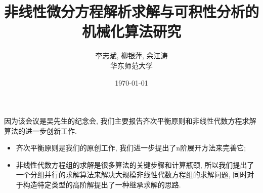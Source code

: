 \documentclass{beamer}
\title[]{非线性微分方程解析求解与可积性分析的机械化算法研究}
\author[]{李志斌, 柳银萍, 余江涛\\[1em] 华东师范大学}
\date{\today}
\begin{document}

    

    

    

\begin{frame}
因为该会议是吴先生的纪念会, 我们主要报告齐次平衡原则和非线性代数方程求解算法的进一步创新工作. 
\begin{itemize}
\item 齐次平衡原则是我们的原创工作, 我们进一步提出了n阶展开方法来完善它; 
\item 非线性代数方程组的求解是很多算法的关键步骤和计算瓶颈, 所以我们提出了一个分组并行的求解算法来解决大规模非线性代数方程组的求解问题, 同时对于构造特定类型的高阶解提出了一种继承求解的思路. 
\end{itemize}

\end{frame}
\end{document}
